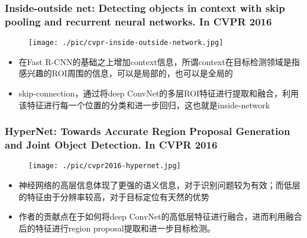 \documentclass{beamer}
\begin{document}
\begin{frame}
  \frametitle{Inside-outside net: Detecting objects in context with skip
    pooling and recurrent neural networks. In CVPR 2016}

  \begin{figure}[!htb]
    \centering
    \texttt{[image: ./pic/cvpr-inside-outside-network.jpg]}
  \end{figure}
  \begin{itemize}
  \item 在Fast R-CNN的基础之上增加context信息，所谓context在目标检测领域是指感兴趣的ROI周围的信息，可以是局部的，也可以是全局的
  \item skip-connection，通过将deep ConvNet的多层ROI特征进行提取和融合，利用该特征进行每一个位置的分类和进一步回归，这也就是inside-network

  \end{itemize}

\end{frame}

\begin{frame}
  \frametitle{HyperNet: Towards Accurate Region Proposal Generation and Joint
    Object Detection. In CVPR 2016}

  \begin{figure}[!htb]
    \centering
    \texttt{[image: ./pic/cvpr2016-hypernet.jpg]}
  \end{figure}

  \begin{itemize}
  \item  神经网络的高层信息体现了更强的语义信息，对于识别问题较为有效；而低层的特征由于分辨率较高，对于目标定位有天然的优势
  \item 作者的贡献点在于如何将deep ConvNet的高低层特征进行融合，进而利用融合后的特征进行region proposal提取和进一步目标检测。

  \end{itemize}
  

\end{frame}



\end{document}
